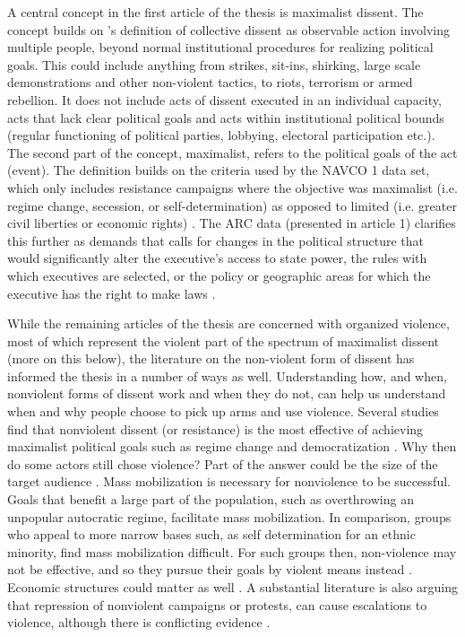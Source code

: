
A central concept in the first article of the thesis is maximalist dissent. The
concept builds on \citet{TillyCharles1978Fmtr}'s definition of collective
dissent as observable action involving multiple people, beyond normal
institutional procedures for realizing political goals. This could include
anything from strikes, sit-ins, shirking, large scale demonstrations and other
non-violent tactics, to riots, terrorism or armed rebellion. It does not include
acts of dissent executed in an individual capacity, acts that lack clear
political goals and acts within institutional political bounds (regular
functioning of political parties, lobbying, electoral participation etc.). The
second part of the concept, maximalist, refers to the political goals of the act
(event). The definition builds on the criteria used by the NAVCO 1 data set,
which only includes resistance campaigns where the objective was maximalist
(i.e. regime change, secession, or self-determination) as opposed to limited
(i.e. greater civil liberties or economic rights)
\citep{DVN/0UZOTX/B4RH7S_2019}. The ARC data (presented in article 1) clarifies
this further as demands that calls for changes in the political structure that
would significantly alter the executive’s access to state power, the rules with
which executives are selected, or the policy or geographic areas for which the
executive has the right to make laws \citep{Butcher_2022}.

While the remaining articles of the thesis are concerned with organized
violence, most of which represent the violent part of the spectrum of maximalist
dissent (more on this below), the literature on the non-violent form of dissent
has informed the thesis in a number of ways as well. Understanding how, and
when, nonviolent forms of dissent work and when they do not, can help us
understand when and why people choose to pick up arms and use violence. Several
studies find that nonviolent dissent (or resistance) is the most effective of
achieving maximalist political goals \citep{chenoweth2011civil, Stephan_2008}
such as regime change and democratization \citep{Celestino_2013, Bethke_2019}.
Why then do some actors still chose violence? Part of the answer could be the
size of the target audience \citep{Gleditsch_2021}. Mass mobilization is
necessary for nonviolence to be successful. Goals that benefit a large part of
the population, such as overthrowing an unpopular autocratic regime, facilitate
mass mobilization. In comparison, groups who appeal to more narrow bases such,
as self determination for an ethnic minority, find mass mobilization difficult.
For such groups then, non-violence may not be effective, and so they pursue
their goals by violent means instead \citep{Gleditsch_2021}. Economic structures
could matter as well \citep{Butcher_2014}. A substantial literature is also
arguing that repression of nonviolent campaigns or protests, can cause
escalations to violence, although there is conflicting evidence
\citep{Chenoweth_2017, Lichbach_1987}.


